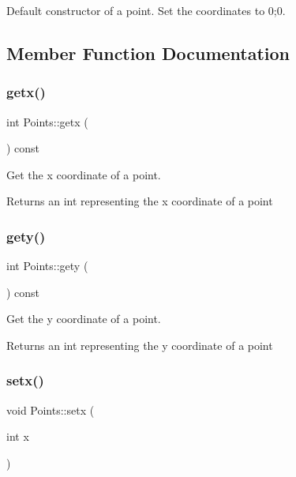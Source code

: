 Default constructor of a point. Set the coordinates to 0;0. 



\subsection{Member Function Documentation}
\mbox{\label{class_points_a3228a003ef8408c5d51159889c14a210}} 
\subsubsection{\texorpdfstring{getx()}{getx()}}
{\footnotesize\ttfamily int Points\+::getx (\begin{DoxyParamCaption}{ }\end{DoxyParamCaption}) const}



Get the x coordinate of a point. 

\begin{DoxyReturn}{Returns}
an int representing the x coordinate of a point 
\end{DoxyReturn}
\mbox{\label{class_points_aaaa2207f4ca3a034e4992b11096e5b30}} 
\subsubsection{\texorpdfstring{gety()}{gety()}}
{\footnotesize\ttfamily int Points\+::gety (\begin{DoxyParamCaption}{ }\end{DoxyParamCaption}) const}



Get the y coordinate of a point. 

\begin{DoxyReturn}{Returns}
an int representing the y coordinate of a point 
\end{DoxyReturn}
\mbox{\label{class_points_a47c7b83df0178f8f9315f76d629335cb}} 
\subsubsection{\texorpdfstring{setx()}{setx()}}
{\footnotesize\ttfamily void Points\+::setx (\begin{DoxyParamCaption}\item[{int}]{x }\end{DoxyParamCaption})}



